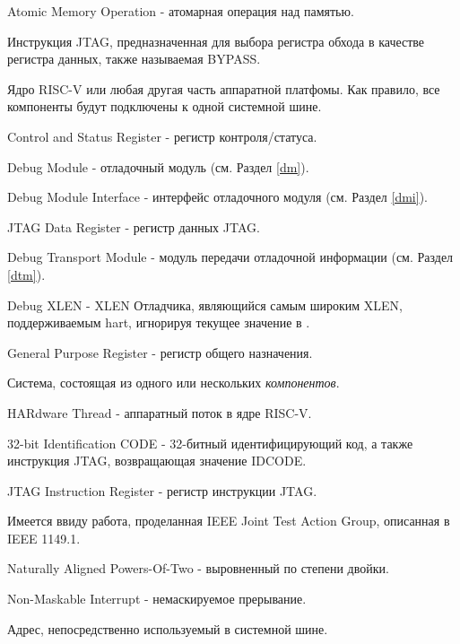 \begin{description}[style=nextline]
    \item[AMO]
        Atomic Memory Operation - атомарная операция над памятью.
    \item[BYPASS]
        Инструкция JTAG, предназначенная для выбора регистра обхода в качестве регистра данных, также называемая BYPASS.
    \item[компонент]
        Ядро RISC-V или любая другая часть аппаратной платфомы.
        Как правило, все компоненты будут подключены к одной системной
        шине.
    \item[CSR]
        Control and Status Register - регистр контроля/статуса.
    \item[DM]
        Debug Module - отладочный модуль (см. Раздел \ref{dm}).
    \item[DMI]
        Debug Module Interface - интерфейс отладочного модуля (см. Раздел \ref{dmi}).
    \item[DR]
        JTAG Data Register - регистр данных JTAG.
    \item[DTM]
        Debug Transport Module - модуль передачи отладочной информации (см. Раздел \ref{dtm}).
    \item[DXLEN]
        Debug XLEN - XLEN Отладчика, являющийся самым широким XLEN,
        поддерживаемым hart, игнорируя текущее значение \Fmxl в \Rmisa.
    \item[GPR]
        General Purpose Register - регистр общего назначения.
    \item[аппаратная платформа]
        Система, состоящая из одного или нескольких \emph{компонентов}.
    \item[hart]
        HARdware Thread - аппаратный поток в ядре RISC-V.
    \item[IDCODE]
        32-bit Identification CODE - 32-битный идентифицирующий код, а также инструкция JTAG,
        возвращающая значение IDCODE.
    \item[IR]
        JTAG Instruction Register - регистр инструкции JTAG.
    \item[JTAG]
        Имеется ввиду работа, проделанная IEEE Joint Test Action Group, описанная в
        IEEE 1149.1.
    \item[NAPOT]
        Naturally Aligned Powers-Of-Two - выровненный по степени двойки.
    \item[NMI]
        Non-Maskable Interrupt - немаскируемое прерывание.
    \item[физический адрес]
        Адрес, непосредственно используемый в системной шине.

\end{description}
